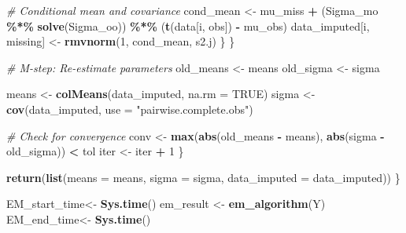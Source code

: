 \documentclass[12pt]{article}
\newenvironment{Shaded}{\begin{snugshade}}{\end{snugshade}}
\newcommand{\AttributeTok}[1]{\textcolor[rgb]{0.13,0.29,0.53}{#1}}
\newcommand{\CommentTok}[1]{\textcolor[rgb]{0.56,0.35,0.01}{\textit{#1}}}
\newcommand{\ConstantTok}[1]{\textcolor[rgb]{0.56,0.35,0.01}{#1}}
\newcommand{\DecValTok}[1]{\textcolor[rgb]{0.00,0.00,0.81}{#1}}
\newcommand{\FunctionTok}[1]{\textcolor[rgb]{0.13,0.29,0.53}{\textbf{#1}}}
\newcommand{\NormalTok}[1]{#1}
\newcommand{\OtherTok}[1]{\textcolor[rgb]{0.56,0.35,0.01}{#1}}
\newcommand{\SpecialCharTok}[1]{\textcolor[rgb]{0.81,0.36,0.00}{\textbf{#1}}}
\newcommand{\StringTok}[1]{\textcolor[rgb]{0.31,0.60,0.02}{#1}}
\begin{document}
\begin{Shaded}
\begin{Highlighting}[]
                \CommentTok{\# Conditional mean and covariance}
\NormalTok{                cond\_mean }\OtherTok{\textless{}{-}}\NormalTok{ mu\_miss }\SpecialCharTok{+}\NormalTok{ (Sigma\_mo }\SpecialCharTok{\%*\%} \FunctionTok{solve}\NormalTok{(Sigma\_oo)) }\SpecialCharTok{\%*\%}\NormalTok{ (}\FunctionTok{t}\NormalTok{(data[i, obs]) }\SpecialCharTok{{-}}\NormalTok{ mu\_obs)}
\NormalTok{                data\_imputed[i, missing] }\OtherTok{\textless{}{-}} \FunctionTok{rmvnorm}\NormalTok{(}\DecValTok{1}\NormalTok{, cond\_mean, s2.j)}
\NormalTok{            \}}
\NormalTok{        \}}
      
        \CommentTok{\# M{-}step: Re{-}estimate parameters}
\NormalTok{        old\_means }\OtherTok{\textless{}{-}}\NormalTok{ means}
\NormalTok{        old\_sigma }\OtherTok{\textless{}{-}}\NormalTok{ sigma}
        
\NormalTok{        means }\OtherTok{\textless{}{-}} \FunctionTok{colMeans}\NormalTok{(data\_imputed, }\AttributeTok{na.rm =} \ConstantTok{TRUE}\NormalTok{)}
\NormalTok{        sigma }\OtherTok{\textless{}{-}} \FunctionTok{cov}\NormalTok{(data\_imputed, }\AttributeTok{use =} \StringTok{"pairwise.complete.obs"}\NormalTok{)}

        \CommentTok{\# Check for convergence}
\NormalTok{        conv }\OtherTok{\textless{}{-}} \FunctionTok{max}\NormalTok{(}\FunctionTok{abs}\NormalTok{(old\_means }\SpecialCharTok{{-}}\NormalTok{ means), }\FunctionTok{abs}\NormalTok{(sigma }\SpecialCharTok{{-}}\NormalTok{ old\_sigma)) }\SpecialCharTok{\textless{}}\NormalTok{ tol}
\NormalTok{        iter }\OtherTok{\textless{}{-}}\NormalTok{ iter }\SpecialCharTok{+} \DecValTok{1}
\NormalTok{    \}}
  
    \FunctionTok{return}\NormalTok{(}\FunctionTok{list}\NormalTok{(}\AttributeTok{means =}\NormalTok{ means, }\AttributeTok{sigma =}\NormalTok{ sigma, }\AttributeTok{data\_imputed =}\NormalTok{ data\_imputed))}
\NormalTok{\}}
\end{Highlighting}
\end{Shaded}

\begin{Shaded}
\begin{Highlighting}[]
\NormalTok{EM\_start\_time}\OtherTok{\textless{}{-}} \FunctionTok{Sys.time}\NormalTok{()}
\NormalTok{em\_result }\OtherTok{\textless{}{-}} \FunctionTok{em\_algorithm}\NormalTok{(Y)}
\NormalTok{EM\_end\_time}\OtherTok{\textless{}{-}} \FunctionTok{Sys.time}\NormalTok{()}
\end{Highlighting}
\end{Shaded}
\end{document}
